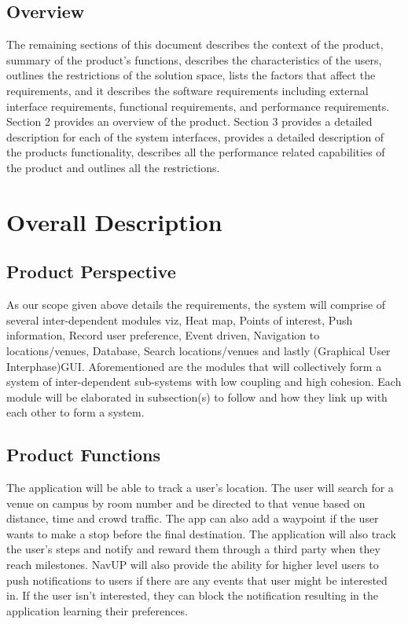 \documentclass[11pt]{article}
\begin{document}
	\subsection{Overview}
	The remaining sections of this document describes the context of the product, summary of the product’s functions, describes the characteristics of the users, outlines the restrictions of the solution space, lists the factors that affect the requirements, and it describes the software requirements including external interface requirements, functional requirements,  and performance requirements. Section 2 provides an overview of the product. Section 3 provides a detailed description for each of the system interfaces, provides a detailed description of the products functionality, describes all the performance related capabilities of the product and outlines all the restrictions. 

	\section{Overall Description}
	
		\subsection{Product Perspective}
		As our scope given above details the requirements, the system will comprise of several inter-dependent modules viz, Heat map, Points of interest, Push information, Record user preference, Event driven, Navigation to locations/venues, Database, Search locations/venues and lastly (Graphical User Interphase)GUI. Aforementioned are the modules that will collectively form a system of inter-dependent sub-systems with low coupling and high cohesion. Each module will be elaborated in subsection(s) to follow and how they link up with each other to form a system. 
        
		\subsection{Product Functions}
      The application will be able to track a user’s location. The user will search for a venue on campus by room number and 			be directed to that venue based on distance, time and crowd traffic. The app can also add a waypoint if the user wants 			to make a stop before the final destination. The application will also track the user’s steps and notify and reward them 		 through a third party when they reach milestones. NavUP will also provide the ability for higher level users to push 			notifications to users if there are any events that user might be interested in. If the user isn’t interested, they can 		block the notification resulting in the application learning their preferences. 
\end{document}
